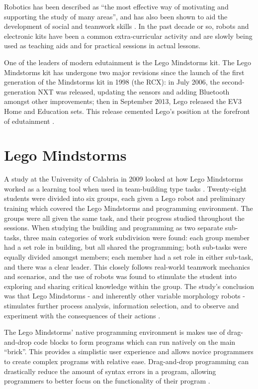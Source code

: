 \documentclass{report}
\begin{document}
    Robotics has been described as \enquote{the most effective way of motivating and supporting the study of many areas}, and has also been shown to aid the development of social and teamwork skills \cite{Johnson2003}. In the past decade or so, robots and electronic kits have been a common extra-curricular activity and are slowly being used as teaching aids and for practical sessions in actual lessons.
    
	One of the leaders of modern edutainment is the Lego Mindstorms kit. The Lego Mindstorms kit has undergone two major revisions since the launch of the first generation of the Mindstorms kit in 1998 (the RCX): in July 2006, the second-generation NXT was released, updating the sensors and adding Bluetooth amongst other improvements; then in September 2013, Lego released the EV3 Home and Education sets. This release cemented Lego's position at the forefront of edutainment \cite{Becker}.
    
    \section{Lego Mindstorms}
    A study at the University of Calabria in 2009 looked at how Lego Mindstorms worked as a learning tool when used in team-building type tasks \cite{Bilotta2009}. Twenty-eight students were divided into six groups, each given a Lego robot and preliminary training which covered the Lego Mindstorms and programming environment. The groups were all given the same task, and their progress studied throughout the sessions. When studying the building and programming as two separate sub-tasks, three main categories of work subdivision were found: each group member had a set role in building, but all shared the programming; both sub-tasks were equally divided amongst members; each member had a set role in either sub-task, and there was a clear leader. This closely follows real-world teamwork mechanics and scenarios, and the use of robots was found to stimulate the student into exploring and sharing critical knowledge within the group. The study's conclusion was that Lego Mindstorms - and inherently other variable morphology robots - stimulates further process analysis, information selection, and to observe and experiment with the consequences of their actions \cite{Bilotta2009}.
    
    The Lego Mindstorms' native programming environment is makes use of drag-and-drop code blocks to form programs which can run natively on the main \enquote{brick}. This provides a simplistic user experience and allows novice programmers to create complex programs with relative ease. Drag-and-drop programming can drastically reduce the amount of syntax errors in a program, allowing programmers to better focus on the functionality of their program \cite{Kelleher2002}.
\end{document}
